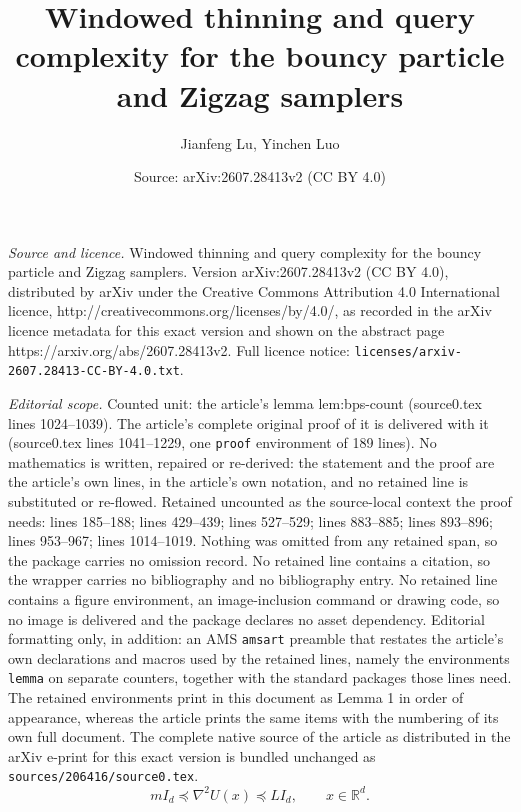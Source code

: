 \documentclass[10pt,a4paper]{amsart}
\title{Windowed thinning and query complexity for the bouncy particle and Zigzag samplers}
\author{Jianfeng Lu, Yinchen Luo}
\date{Source: arXiv:2607.28413v2 (CC BY 4.0)}
\newcommand{\R}{\RR}
\newcommand{\RR}{\mathbb{R}}
\begin{document}
\maketitle

\noindent\emph{Source and licence.} Windowed thinning and query complexity for the bouncy particle and Zigzag samplers. Version arXiv:2607.28413v2 (CC BY 4.0), distributed by arXiv under the Creative Commons Attribution 4.0 International licence, http://creativecommons.org/licenses/by/4.0/, as recorded in the arXiv licence metadata for this exact version and shown on the abstract page https://arxiv.org/abs/2607.28413v2. Full licence notice: \texttt{licenses/arxiv-2607.28413-CC-BY-4.0.txt}.\par\smallskip

\noindent\textit{Editorial scope.} Counted unit: the article's lemma lem:bps-count (source0.tex lines 1024--1039). The article's complete original proof of it is delivered with it (source0.tex lines 1041--1229, one \texttt{proof} environment of 189 lines). No mathematics is written, repaired or re-derived: the statement and the proof are the article's own lines, in the article's own notation, and no retained line is substituted or re-flowed.  Retained uncounted as the source-local context the proof needs: lines 185--188; lines 429--439; lines 527--529; lines 883--885; lines 893--896; lines 953--967; lines 1014--1019.  Nothing was omitted from any retained span, so the package carries no omission record.  No retained line contains a citation, so the wrapper carries no bibliography and no bibliography entry.  No retained line contains a figure environment, an image-inclusion command or drawing code, so no image is delivered and the package declares no asset dependency.  Editorial formatting only, in addition: an AMS \texttt{amsart} preamble that restates the article's own declarations and macros used by the retained lines, namely the environments \texttt{lemma} on separate counters, together with the standard packages those lines need.  The retained environments print in this document as Lemma 1 in order of appearance, whereas the article prints the same items with the numbering of its own full document.  The complete native source of the article as distributed in the arXiv e-print for this exact version is bundled unchanged as \texttt{sources/206416/source0.tex}.
\begin{equation}\label{eq:hessian-bounds}
        m I_d \preceq \nabla^2 U(x) \preceq L I_d,
        \qquad x\in\R^d.
\end{equation}
\end{document}
